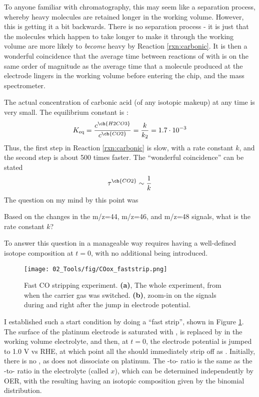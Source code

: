 To anyone familiar with chromatography, this may seem like a separation process, whereby heavy  molecules are retained longer in the working volume. However, this is getting it a bit backwards. There is no separation process - it is just that the  molecules which happen to take longer to make it through the working volume are more likely to \textit{become} heavy by Reaction \ref{rxn:carbonic}. It is then a wonderful coincidence that the average time between reactions of  with  is on the same order of magnitude as the average time that a  molecule produced at the electrode lingers in the working volume before entering the chip, and the mass spectrometer.

The actual concentration of carbonic acid (of any isotopic makeup) at any time is very small. The equilibrium constant is \cite{CRC2015}:
\begin{equation}
K_\text{eq} = \frac{c^{\ch{H2CO3}}}{c^{\ch{CO2}}} = \frac{k}{k_2} = 1.7\cdot 10^{-3}
\end{equation}
Thus, the first step in Reaction \ref{rxn:carbonic} is slow, with a rate constant $k$, and the second step is about 500 times faster. The ``wonderful coincidence'' can be stated
\begin{equation}
\tau^{\ch{CO2}}\sim\frac{1}{k}
\end{equation}
The question on my mind by this point was
\begin{question}
Based on the changes in the m/z=44, m/z=46, and m/z=48 signals, what is the rate constant $k$?
\end{question}
To answer this question in a manageable way requires having a well-defined isotope composition at $t=0$, with no additional  being introduced.
\begin{figure}[h!]
	\centering
	\texttt{[image: 02\_Tools/fig/COox\_faststrip.png]}
	\caption{Fast CO stripping experiment. \textbf{(a)}, The whole experiment, from when the carrier gas was switched. \textbf{(b)}, zoom-in on the  signals during and right after the jump in electrode potential.}
	\label{fig:COox_faststrip}
\end{figure}
I established such a start condition by doing a ``fast  strip'', shown in Figure \ref{fig:COox_faststrip}. The surface of the platinum electrode is saturated with ,  is replaced by  in the working volume electrolyte, and then, at $t=0$, the electrode potential is jumped to 1.0 V vs RHE, at which point all the  should immediately strip off as . Initially, there is no , as  does not dissociate on platinum. The -to- ratio is the same as the -to- ratio in the electrolyte (called $x$), which can be determined independently by OER, with the resulting  having an isotopic composition given by the binomial distribution.

